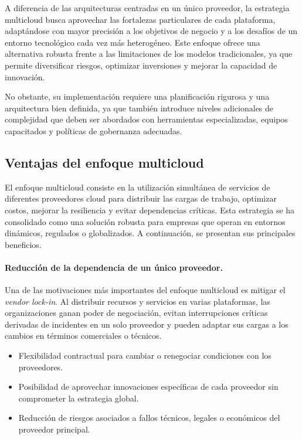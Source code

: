 {        A diferencia de las arquitecturas centradas en un único proveedor, la estrategia multicloud busca aprovechar las fortalezas particulares de cada plataforma, adaptándose con mayor precisión a los objetivos de negocio y a los desafíos de un entorno tecnológico cada vez más heterogéneo. Este enfoque ofrece una alternativa robusta frente a las limitaciones de los modelos tradicionales, ya que permite diversificar riesgos, optimizar inversiones y mejorar la capacidad de innovación.
        
        No obstante, su implementación requiere una planificación rigurosa y una arquitectura bien definida, ya que también introduce niveles adicionales de complejidad que deben ser abordados con herramientas especializadas, equipos capacitados y políticas de gobernanza adecuadas.

        \subsection{Ventajas del enfoque multicloud}
            El enfoque multicloud consiste en la utilización simultánea de servicios de diferentes proveedores cloud para distribuir las cargas de trabajo, optimizar costos, mejorar la resiliencia y evitar dependencias críticas. Esta estrategia se ha consolidado como una solución robusta para empresas que operan en entornos dinámicos, regulados o globalizados. A continuación, se presentan sus principales beneficios.
            
            \paragraph{Reducción de la dependencia de un único proveedor.} 
            Una de las motivaciones más importantes del enfoque multicloud es mitigar el \textit{vendor lock-in}. Al distribuir recursos y servicios en varias plataformas, las organizaciones ganan poder de negociación, evitan interrupciones críticas derivadas de incidentes en un solo proveedor y pueden adaptar sus cargas a los cambios en términos comerciales o técnicos.
            
            \begin{itemize}
                \item Flexibilidad contractual para cambiar o renegociar condiciones con los proveedores.
                \item Posibilidad de aprovechar innovaciones específicas de cada proveedor sin comprometer la estrategia global.
                \item Reducción de riesgos asociados a fallos técnicos, legales o económicos del proveedor principal.
            \end{itemize}
            
}
